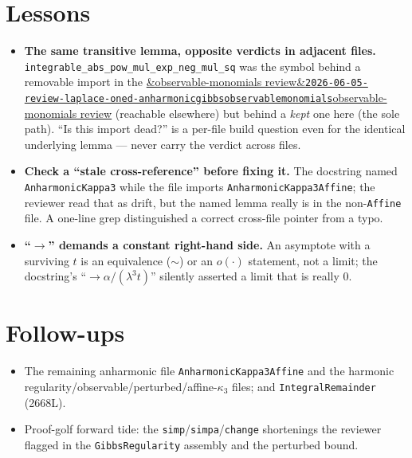 \documentclass[11pt]{article}
\newcommand{\reviewref}[2][]{\href{https://therisensea.org/reviews/#2/}{\ifx&#1&\texttt{#2}\else#1\fi}}
\begin{document}
\section{Lessons}
\begin{itemize}[noitemsep]
  \item \textbf{The same transitive lemma, opposite verdicts in adjacent files.}
    \texttt{integrable\_abs\_pow\_mul\_exp\_neg\_mul\_sq} was the symbol behind a removable import in
    the \reviewref[observable-monomials review]{2026-06-05-review-laplace-oned-anharmonicgibbsobservablemonomials}
    (reachable elsewhere) but behind a \emph{kept} one here (the sole path). ``Is this import dead?''
    is a per-file build question even for the identical underlying lemma --- never carry the verdict
    across files.
  \item \textbf{Check a ``stale cross-reference'' before fixing it.} The docstring named
    \texttt{AnharmonicKappa3} while the file imports \texttt{AnharmonicKappa3Affine}; the reviewer
    read that as drift, but the named lemma really is in the non-\texttt{Affine} file. A one-line
    grep distinguished a correct cross-file pointer from a typo.
  \item \textbf{``$\to$'' demands a constant right-hand side.} An asymptote with a surviving $t$ is
    an equivalence ($\sim$) or an $o(\cdot)$ statement, not a limit; the docstring's ``$\to
    \alpha/(\lambda^3 t)$'' silently asserted a limit that is really $0$.
\end{itemize}

\section{Follow-ups}
\begin{itemize}[noitemsep]
  \item The remaining anharmonic file \texttt{AnharmonicKappa3Affine} and the harmonic
    regularity/observable/perturbed/affine-$\kappa_3$ files; and \texttt{IntegralRemainder} (2668L).
  \item Proof-golf forward tide: the \texttt{simp}/\texttt{simpa}/\texttt{change} shortenings the
    reviewer flagged in the \texttt{GibbsRegularity} assembly and the perturbed bound.
\end{itemize}
\end{document}
